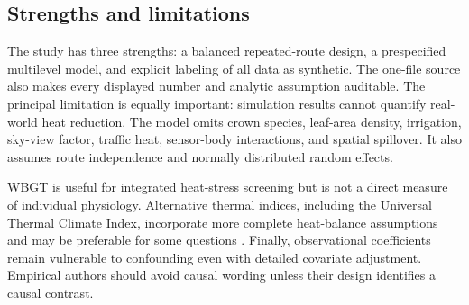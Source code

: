 \subsection{Strengths and limitations}
The study has three strengths: a balanced repeated-route design, a prespecified multilevel model, and explicit labeling of all data as synthetic. The one-file source also makes every displayed number and analytic assumption auditable. The principal limitation is equally important: simulation results cannot quantify real-world heat reduction. The model omits crown species, leaf-area density, irrigation, sky-view factor, traffic heat, sensor-body interactions, and spatial spillover. It also assumes route independence and normally distributed random effects.

WBGT is useful for integrated heat-stress screening but is not a direct measure of individual physiology. Alternative thermal indices, including the Universal Thermal Climate Index, incorporate more complete heat-balance assumptions and may be preferable for some questions \cite{Brode2012}. Finally, observational coefficients remain vulnerable to confounding even with detailed covariate adjustment. Empirical authors should avoid causal wording unless their design identifies a causal contrast.
